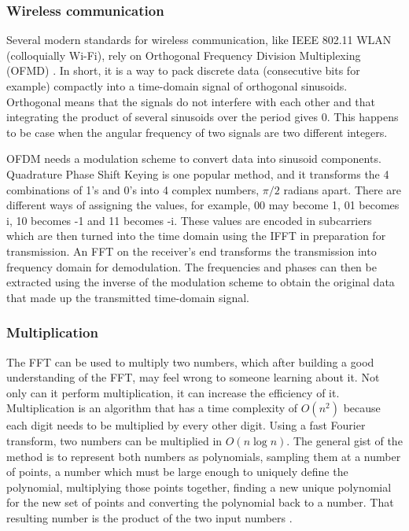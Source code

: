 
\subsubsection{Wireless communication}
Several modern standards for wireless communication, like IEEE 802.11 WLAN (colloquially Wi-Fi), rely on Orthogonal Frequency Division Multiplexing (OFMD) \cite{GnanishivaramNeeraja2014}. In short, it is a way to pack discrete data (consecutive bits for example) compactly into a time-domain signal of orthogonal sinusoids. Orthogonal means that the signals do not interfere with each other and that integrating the product of several sinusoids over the period gives 0. This happens to be case when the angular frequency of two signals are two different integers. 

OFDM needs a modulation scheme to convert data into sinusoid components. Quadrature Phase Shift Keying is one popular method, and it transforms the 4 combinations of 1's and 0's into 4 complex numbers, $\pi/2$ radians apart. There are different ways of assigning the values, for example, 00 may become 1, 01 becomes i, 10 becomes -1 and 11 becomes -i. These values are encoded in subcarriers which are then turned into the time domain using the IFFT in preparation for transmission. An FFT on the receiver's end transforms the transmission into frequency domain for demodulation. The frequencies and phases can then be extracted using the inverse of the modulation scheme to obtain the original data that made up the transmitted time-domain signal.

\subsubsection{Multiplication}
The FFT can be used to multiply two numbers, which after building a good understanding of the FFT, may feel wrong to someone learning about it. Not only can it perform multiplication, it can increase the efficiency of it. Multiplication is an algorithm that has a time complexity of $O(n^2)$ because each digit needs to be multiplied by every other digit. Using a fast Fourier transform, two numbers can be multiplied in $O(n \log n)$. The general gist of the method is to represent both numbers as polynomials, sampling them at a number of points, a number which must be large enough to uniquely define the polynomial, multiplying those points together, finding a new unique polynomial for the new set of points and converting the polynomial back to a number. That resulting number is the product of the two input numbers \cite{Reducible2020}. 

